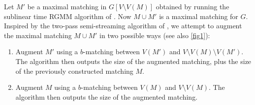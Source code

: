 \documentclass[letterpaper,11pt]{article}
\begin{document}
Let $M'$ be a maximal matching in $G[V \setminus V(M)]$ obtained by running the sublinear time RGMM algorithm of \cite{Behnezhad21}. Now $M \cup M'$ is a maximal matching for $G$. Inspired by the two-pass semi-streaming algorithm of \cite{KonradN21}, we attempt to augment the maximal matching $M \cup M'$ in two possible ways (see also \cref{fig1}):

\begin{enumerate}
    \item Augment $M'$ using a $b$-matching between $V(M')$ and $V \setminus V(M) \setminus V(M')$. The algorithm then outputs the size of the augmented matching, plus the size of the previously constructed matching $M$.  
    \item Augment $M$ using a $b$-matching between $V(M)$ and $V \setminus V(M)$. The algorithm then outputs the size of the augmented matching.  
\end{enumerate}
\end{document}
